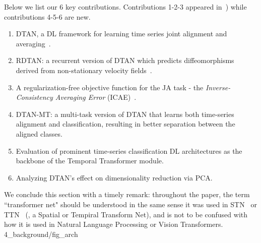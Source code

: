 Below we list our 6 key contributions. Contributions 1-2-3 appeared  in~\cite{Shapira:NIPS:2019:DTAN,Shapira:ICML:2023:RFDTAN}) 
while contributions 4-5-6 are new. 
\begin{enumerate}[leftmargin=.5cm]
\item DTAN, a DL framework for learning time series joint alignment and averaging~\cite{Shapira:NIPS:2019:DTAN}.
\item RDTAN: a recurrent version of DTAN which predicts diffeomorphisms derived from non-stationary velocity fields~\cite{Shapira:NIPS:2019:DTAN}.
\item A regularization-free objective function for the JA task - the \emph{Inverse-Consistency Averaging Error} (ICAE)~\cite{Shapira:ICML:2023:RFDTAN}.
\item DTAN-MT: a multi-task version of DTAN that learns both time-series alignment and classification, resulting in
better separation between the aligned classes.
\item Evaluation of prominent time-series classification DL architectures as the backbone of the Temporal Transformer module.
\item Analyzing DTAN's effect on dimensionality reduction via PCA.
\end{enumerate}
 We conclude this section with a timely remark: throughout the paper, the term ``transformer net" should be  understood in the same sense it was used in STN~\cite{Jaderberg:NIPS:2015:spatial} 
 or TTN~\cite{Shapira:NIPS:2019:DTAN} (\ie, a Spatial or Tempiral Transform Net), and is not to be confused with how it is used in Natural Language Processing or Vision Transformers. 
{4_background/fig_arch}
